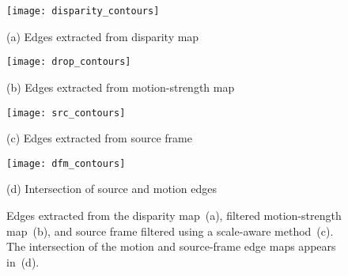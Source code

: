 \begin{figure}[t]
	\begin{minipage}[b]{0.49\linewidth}
		\centering
		\centerline{\texttt{[image: disparity\_contours]} }
		\centerline{\scriptsize{(a) Edges extracted from disparity map}}\medskip
	\end{minipage}
	\begin{minipage}[b]{0.49\linewidth}
		\centering
		\centerline{ \texttt{[image: drop\_contours]} }
		\centerline{\scriptsize{(b) Edges extracted from motion-strength map }}\medskip
	\end{minipage}
	\hfill
	\begin{minipage}[b]{0.49\linewidth}
		\centering
		\centerline{ \texttt{[image: src\_contours]} }
		\centerline{\scriptsize{(c) Edges extracted from source frame}}\medskip
	\end{minipage}
	\hfill
	\begin{minipage}[b]{0.49\linewidth}
		\centering
		\centerline{\texttt{[image: dfm\_contours]} }
		\centerline{\scriptsize{(d) Intersection of source and motion edges}}\medskip
	\end{minipage}
	\begin{minipage}[b]{\linewidth}
    \caption{Edges extracted from the disparity map~(a), filtered motion-strength
        map~(b), and source frame filtered using a scale-aware method~(c). The
        intersection of the motion and source-frame edge maps appears in~(d).}
    \label{fig:edges}
    \end{minipage}
\end{figure}
